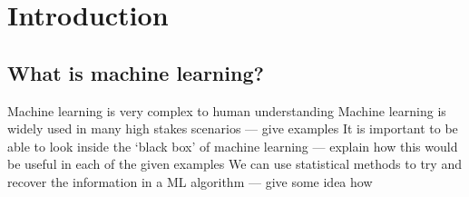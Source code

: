 
\chapter{Introduction}

\section{What is machine learning?}
\begin{todo}
    Machine learning is very complex to human understanding
        Machine learning is widely used in many high stakes scenarios --- give examples
        It is important to be able to look inside the `black box' of machine learning --- explain how this would be useful in each of the given examples
        We can use statistical methods to try and recover the information in a ML algorithm --- give some idea how
\end{todo}
   
    



